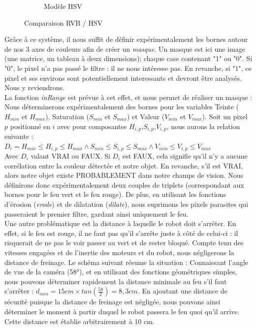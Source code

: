 \begin{itemize}
\begin{figure}[H]
\begin{subfigure}[h]{0.35\textwidth}
					        \caption{Modèle HSV}
					    \end{subfigure}
					    \caption{Comparaison RVB / HSV}
					\end{figure}
					Grâce à ce système, il nous suffit de définir expérimentalement les bornes autour de nos 3 axes de couleurs afin de créer un \textit{masque}. Un masque est ici une image (une matrice, un tableau à deux dimensions); chaque case contenant "1" ou "0". Si "0", le pixel n'a pas passé le filtre : il ne nous intéresse pas. En revanche, si "1", ce pixel et ses environs sont potentiellement interessants et devront être analysés. Nous y reviendrons.\\
					La fonction \textit{inRange} est prévue à cet effet, et nous permet de réaliser un masque : 
					Nous déterminerons expérimentalement des bornes pour les variables Teinte ($H_{min}$ et $H_{max}$), Saturation ($S_{min}$ et $S_{max}$) et Valeur ($V_{min}$ et $V_{max}$). Soit un pixel $p$ positionné en $i$ avec pour composantes $H_{i,p}$,$S_{i,p}$,$V_{i,p}$, nous aurons la relation suivante :
					\\ 
					$D_i = H_{min} \leqslant H_{i,p} \leqslant H_{max} 	\land S_{min} \leqslant S_{i,p} \leqslant S_{max} \land V_{min} \leqslant V_{i,p} \leqslant V_{max}$ \cite{bib20}
					\\
					Avec $D_i$ valant VRAI ou FAUX. Si $D_i$ est FAUX, cela signifie qu'il n'y a aucune corrélation entre la couleur détectée et notre objet. En revanche, s'il est VRAI, alors notre objet existe PROBABLEMENT dans notre champs de vision. Nous définirons donc expérimentalement deux couples de triplets (correspondant aux bornes pour le feu vert et le feu rouge). De plus, en utilisant les fonctions d'érosion (\textit{erode}) et de dilatation (\textit{dilate}), nous suprimons les pixels parasites qui passeraient le premier filtre, gardant ainsi uniquement le feu.
					\\

					Une autre problématique est la distance à laquelle le robot doit s'arrêter. En effet, si le feu est rouge, il ne faut pas qu'il s'arrête juste à côté de celui-ci : il risquerait de ne pas le voir passer au vert et de rester bloqué. Compte tenu des vitesses engagées et de l'inertie des moteurs et du robot, nous négligerons la distance de freinage.
					Le schéma suivant résume la situation :
					Connaissant l'angle de vue de la caméra (58°)\cite{bib18}, et en utilisant des fonctions géométriques simples, nous pouvons déterminer rapidement la distance minimale au feu s'il faut s'arrêter : $d_{min} = 15 cm \times tan(\frac{58}{2}) = 8,3 cm$. En ajoutant une distance de sécurité puisque la distance de freinage est négligée, nous pouvons ainsi déterminer le moment à partir duquel le robot passera le feu quoi qu'il arrive. Cette distance est établie arbitrairement à 10 cm.\\


\end{itemize}
